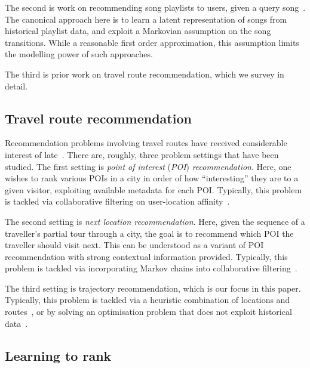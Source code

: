 The second is work on recommending song playlists to users, given a query song~\citep{McFee:2011,chen2012playlist}.
The canonical approach here is to 
learn a latent representation of songs from historical playlist data,
and exploit a Markovian assumption on the song transitions.
While a reasonable first order approximation, this assumption limits the modelling power of such approaches.

The third is prior work on travel route recommendation, which we survey in detail.


%
\subsection{Travel route recommendation}

Recommendation problems involving travel routes have received considerable interest of late~\cite{bao2015recommendations,zheng2015trajectory,zheng2014urban}.
There are, roughly, three problem settings that have been studied.
The first setting is \emph{point of interest} (\emph{POI}) \emph{recommendation}.
Here, one wishes to rank various POIs in a city in order of how ``interesting'' they are to a given visitor,
exploiting
available metadata for each POI.
Typically, this problem is tackled via 
collaborative filtering on user-location affinity~\cite{shi2011personalized,lian2014geomf,hsieh2014mining,yuan2014graph}.

The second setting is \emph{next location recommendation}.
Here, given the sequence of a traveller's partial tour through a city,
the goal is to recommend which POI the traveller should visit next.
This can be understood as a variant of POI recommendation with strong contextual information provided.
Typically, this problem is tackled via 
incorporating Markov chains into collaborative filtering~\cite{fpmc10,ijcai13,zhang2015location}.

The third setting is trajectory recommendation,
which is our focus in this paper.
Typically, this problem is tackled via 
a heuristic combination of locations and routes~\cite{lu2010photo2trip,ijcai15,lu2012personalized}, or
by solving an optimisation problem that does not exploit historical data~\cite{gioniswsdm14,chen2015tripplanner}.


%
\subsection{Learning to rank}

